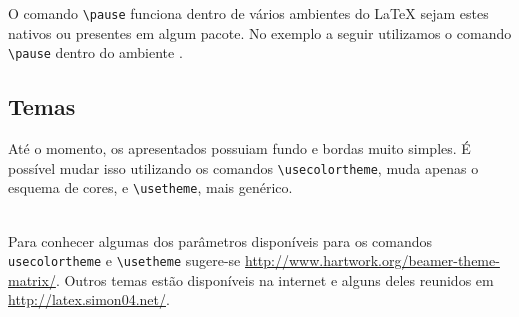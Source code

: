 O comando \lstinline!\pause! funciona dentro de v\'{a}rios ambientes do LaTeX sejam estes nativos ou presentes em algum pacote. No exemplo a seguir utilizamos o comando \lstinline!\pause! dentro do ambiente . \\
\begin{minipage}[c]{0.5\textwidth}
\end{minipage} \quad \vrule \quad
\begin{minipage}[c]{0.35\textwidth}
\end{minipage}

\subsection{Temas}
At\'{e} o momento, os  apresentados possuiam fundo e bordas muito simples. \'{E} poss\'{i}vel mudar isso utilizando os comandos \lstinline!\usecolortheme!, muda apenas o esquema de cores, e \lstinline!\usetheme!, mais gen\'{e}rico. \\
 \\

Para conhecer algumas dos par\^{a}metros dispon\'{i}veis para os comandos \lstinline!usecolortheme! e \lstinline!\usetheme! sugere-se \url{http://www.hartwork.org/beamer-theme-matrix/}. Outros temas est\~{a}o dispon\'{i}veis na internet e alguns deles reunidos em \url{http://latex.simon04.net/}.
